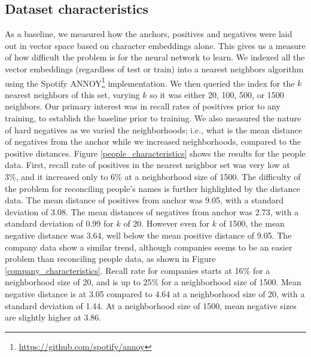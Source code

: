 \subsection{Dataset characteristics}
As a baseline, we measured how the anchors, positives and negatives were laid out in vector space based on character embeddings alone.  This gives us a measure of how difficult the problem is for the neural network to learn.  We indexed all the vector embeddings (regardless of test or train) into a nearest neighbors algorithm using the Spotify ANNOY\footnote{\url{https://github.com/spotify/annoy}} implementation.  We then queried the index for the $k$ nearest neighbors of this set, varying $k$ so it was either 20, 100, 500, or 1500 neighbors.  Our primary interest was in recall rates of positives prior to any training, to establish the baseline prior to training.  We also measured the nature of hard negatives as we varied the neighborhoods; i.e., what is the mean distance of negatives from the anchor while we increased neighborhoods, compared to the positive distances.  Figure \ref{people_characteristics} shows the results for the people data.  First, recall rate of positives in the nearest neighbor set was very low at 3\%, and it increased only to 6\% at a neighborhood size of 1500.  The difficulty of the problem for reconciling people's names is further highlighted by the distance data.  The mean distance of positives from anchor was 9.05, with a standard deviation of 3.08.  The mean distances of negatives from anchor was 2.73, with a standard deviation of 0.99 for $k$ of 20.  However even for $k$ of 1500, the mean negative distance was 3.64, well below the mean positive distance of 9.05.  The company data show a similar trend, although companies seems to be an easier problem than reconciling people data, as shown in Figure \ref{company_characteristics}.  Recall rate for companies starts at 16\% for a neighborhood size of 20, and is up to 25\% for a neighborhood size of 1500.  Mean negative distance is at 3.05 compared to 4.64 at a neighborhood size of 20, with a standard deviation of 1.44.  At a neighborhood size of 1500, mean negative sizes are slightly higher at 3.86. 

